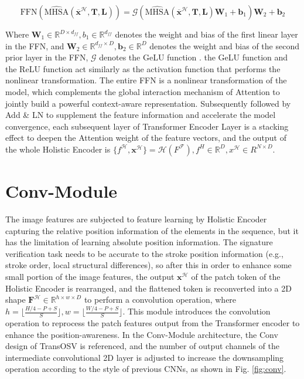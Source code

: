 \begin{equation}
\label{eq10}
  \text{FFN}(\hat{\text{MHSA}}(\overline{\boldsymbol{x}}^\mathcal{H}, \mathbf{T}, \mathbf{L})) = \mathcal{G}(\hat{\text{MHSA}}(\overline{\boldsymbol{x}}^\mathcal{H}, \mathbf{T}, \mathbf{L})\mathbf{W}_1 + \mathbf{b}_1)\mathbf{W}_2 + \mathbf{b}_2
\end{equation}

Where $\mathbf{W}_1\in \mathbb{R}^{D\times d_{ff}}, b_1\in \mathbb{R}^{d_{ff}}$ denotes the weight and bias of the first linear layer in the FFN, and $\mathbf{W}_2\in \mathbb{R}^{d_{ff}\times D}, \mathbf{b}_2\in \mathbb{R}^D$ denotes the weight and bias of the second prior layer in the FFN, $\mathcal{G}$ denotes the GeLU function \cite{15}. the GeLU function and the ReLU function act similarly as the activation function that performs the nonlinear transformation. The entire FFN is a nonlinear transformation of the model, which complements the global interaction mechanism of Attention to jointly build a powerful context-aware representation. Subsequently followed by Add \& LN to supplement the feature information and accelerate the model convergence, each subsequent layer of Transformer Encoder Layer is a stacking effect to deepen the Attention weight of the feature vectors, and the output of the whole Holistic Encoder is $\{f^\mathcal{H}, \boldsymbol{x}^\mathcal{H} \} = \mathcal{H}(F^\mathcal{F}),f^H\in \mathbb{R}^D,x^\mathcal{H} \in R^{N\times D}$.

\section{Conv-Module}

The image features are subjected to feature learning by Holistic Encoder capturing the relative position information of the elements in the sequence, but it has the limitation of learning absolute position information. The signature verification task needs to be accurate to the stroke position information (e.g., stroke order, local structural differences), so after this in order to enhance some small portion of the image features, the output $\boldsymbol{x}^\mathcal{H}$ of the patch token of the Holistic Encoder is rearranged, and the flattened token is reconverted into a 2D shape $\mathbf{F}^\mathcal{H} \in \mathbb{R}^{h\times w\times D}$ to perform a convolution operation, where $h = \lfloor \frac{H/4-P+S}{S}\rfloor,w = \lfloor \frac{W/4-P+S}{S}\rfloor $. This module introduces the convolution operation to reprocess the patch features output from the Transformer encoder to enhance the position-awareness. In the Conv-Module architecture, the Conv design of TransOSV \cite{41} is referenced, and the number of output channels of the intermediate convolutional 2D layer is adjusted to increase the downsampling operation according to the style of previous CNNs, as shown in Fig. \ref{fig:conv}.

